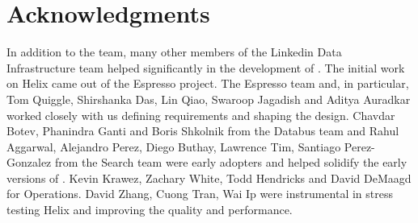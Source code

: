 \section{Acknowledgments}
\label{sec:Acknowledgements}


In addition to the \helix team, many other members of the Linkedin Data Infrastructure team 
helped significantly in the development of \helix. 
The initial work on Helix came out of the Espresso project. The Espresso team
and, in particular, Tom Quiggle, Shirshanka Das, Lin Qiao, Swaroop Jagadish and
Aditya Auradkar worked closely with us defining requirements and shaping the design. 
Chavdar Botev, Phanindra Ganti and Boris Shkolnik from the Databus team and Rahul Aggarwal, Alejandro Perez, 
Diego Buthay, Lawrence Tim, Santiago Perez-Gonzalez from the Search team were 
early adopters and helped solidify the early versions of \helix. Kevin Krawez,
Zachary White, Todd Hendricks and David DeMaagd for Operations.
David Zhang, Cuong Tran, Wai Ip were instrumental in stress
testing Helix and improving the quality and performance. 


